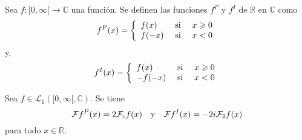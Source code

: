 \documentclass[12pt]{report}
\theoremstyle{largebreak}
\renewcommand{\geq}{\ensuremath{\geqslant}}
\newcommand\cf[3]{\ensuremath{#1:#2\rightarrow#3}}
\newcommand{\fou}[1]{\ensuremath{\mathcal{F}#1}}
\begin{document}
    \begin{mydef}
        Sea $\cf{f}{[0,\infty[}{\mathbb{C}}$ una función. Se definen las funciones $f^P$ y $f^I$ de $\mathbb{R}$ en $\mathbb{C}$ como
        \begin{equation*}
            f^P(x)=\left\{ 
                \begin{array}{lcr}
                    f(x) & \textup{ si } & x\geq0\\
                    f(-x) & \textup{ si } & x<0\\
                \end{array}
            \right.
        \end{equation*}
        y,
        \begin{equation*}
            f^I(x)=\left\{ 
                \begin{array}{lcr}
                    f(x) & \textup{ si } & x\geq0\\
                    -f(-x) & \textup{ si } & x<0\\
                \end{array}
            \right.
        \end{equation*}
    \end{mydef}

    \begin{propo}
        Sea $f\in\mathcal{L}_1([0,\infty[,\mathbb{C})$. Se tiene
        \begin{equation*}
            \fou{f^P}(x)=2\mathcal{F}_cf(x)\quad\textup{y}\quad\fou{f^I}(x)=-2i\mathcal{F}_2f(x)
        \end{equation*}
        para todo $x\in\mathbb{R}$.
    \end{propo}
\end{document}

